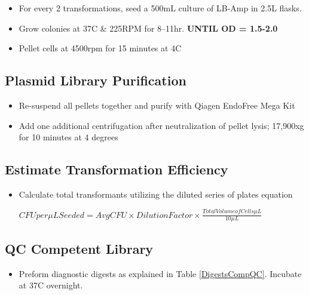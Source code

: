 \documentclass[a4paper]{article}
\begin{document}
\begin{itemize}
            \item For every 2 transformations, seed a 500mL culture of LB-Amp in 2.5L flasks.  
            
            \item Grow colonies at 37C \& 225RPM for 8–11hr. \textbf{UNTIL OD = 1.5-2.0}
            
            \item Pellet cells at 4500rpm for 15 minutes at 4C
            
        \end{itemize}
    
    \subsection{Plasmid Library Purification} 
    	\begin{itemize}
                	
            \item Re-suspend all pellets together  and purify with Qiagen EndoFree Mega Kit
            
            \item Add one additional centrifugation after neutralization of pellet lysis; 17,900xg for 10 minutes at 4 degrees 
        
    	\end{itemize}    
     
     \subsection{Estimate Transformation Efficiency}
     	\begin{itemize}
     		\item Calculate total transformants utilizing the diluted series of plates equation 
 
			 	\begin{center}
        			$CFU per\mu L  Seeded = AvgCFU \times Dilution Factor \times \frac{Total Volume of Cells \mu L}{10 \mu L}$
				\end{center}
            
		\end{itemize}
	
    \subsection{QC Competent Library}
     	\begin{itemize}

			\item Preform diagnostic digests as explained in Table \ref{DigestsCompQC}. Incubate at 37C overnight.

		\end{itemize}
        
\end{document}

